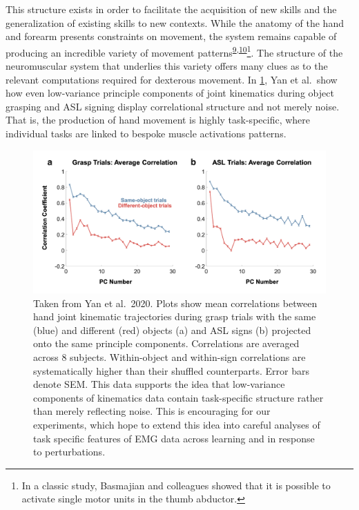 \documentclass[
  a4paper,
]{article}
\begin{document}
This structure exists in order to facilitate the acquisition of new
skills and the generalization of existing skills to new contexts. While
the anatomy of the hand and forearm presents constraints on movement,
the system remains capable of producing an incredible variety of
movement
patterns\textsuperscript{\protect\hyperlink{ref-yanUnexpectedComplexityEveryday2020}{9},\protect\hyperlink{ref-Basmajian1963}{10}}\footnote{In
  a classic study, Basmajian and colleagues showed that it is possible
  to activate single motor units in the thumb abductor.}. The structure
of the neuromuscular system that underlies this variety offers many
clues as to the relevant computations required for dexterous movement.
In \cref{fig:low_variance_PCs}, Yan et al.~show how even low-variance
principle components of joint kinematics during object grasping and ASL
signing display correlational structure and not merely noise. That is,
the production of hand movement is highly task-specific, where
individual tasks are linked to bespoke muscle activations patterns.

\begin{figure}
\hypertarget{fig:low_variance_PCs}{%
\centering
\includegraphics[width=1\textwidth,height=\textheight]{images/physiology/background/low_variance_PCs.png}
\caption{Taken from Yan et al.~2020. Plots show mean correlations
between hand joint kinematic trajectories during grasp trials with the
same (blue) and different (red) objects (a) and ASL signs (b) projected
onto the same principle components. Correlations are averaged across 8
subjects. Within-object and within-sign correlations are systematically
higher than their shuffled counterparts. Error bars denote SEM. This
data supports the idea that low-variance components of kinematics data
contain task-specific structure rather than merely reflecting noise.
This is encouraging for our experiments, which hope to extend this idea
into careful analyses of task specific features of EMG data across
learning and in response to perturbations.}\label{fig:low_variance_PCs}
}
\end{figure}
\end{document}
